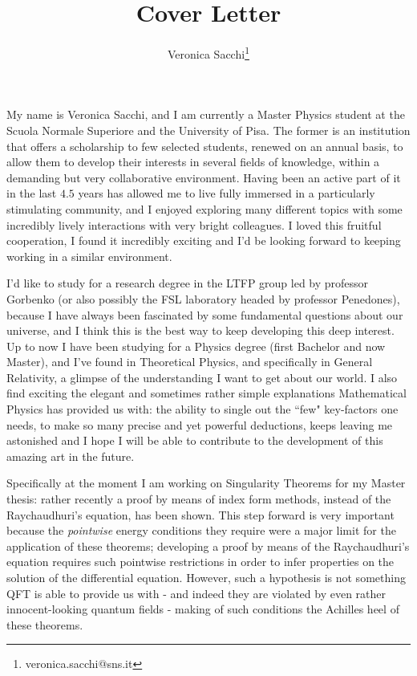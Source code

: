 \documentclass[12pt, a4paper]{article}
\title{Cover Letter}
\author{Veronica Sacchi\thanks{veronica.sacchi@sns.it}}
\begin{document}
\maketitle

My name is Veronica Sacchi, and I am currently a Master Physics student at the Scuola Normale Superiore and the University of Pisa. The former is an institution that offers a scholarship to few selected students, renewed on an annual basis, to allow them to develop their interests in several fields of knowledge, within a demanding but very collaborative environment.
Having been an active part of it in the last \(4.5\) years has allowed me to live fully immersed in a particularly stimulating community, and I enjoyed exploring many different topics with some incredibly lively interactions with very bright colleagues. I loved this fruitful cooperation, I found it incredibly exciting and I'd be looking forward to keeping working in a similar environment.

I'd like to study for a research degree in the LTFP group led by professor Gorbenko (or also possibly the FSL laboratory headed by professor Penedones), because I have always been fascinated by some fundamental questions about our universe, and I think this is the best way to keep developing this deep interest.
Up to now I have been studying for a Physics degree (first Bachelor and now Master), and I've found in Theoretical Physics, and specifically in General Relativity, a glimpse of the understanding I want to get about our world. 
I also find exciting the elegant and sometimes rather simple explanations Mathematical Physics has provided us with: the ability to single out the ``few" key-factors one needs, to make so many precise and yet powerful deductions, keeps leaving me astonished and I hope I will be able to contribute to the development of this amazing art in the future.

Specifically at the moment I am working on Singularity Theorems for my Master thesis: rather recently a proof by means of index form methods, instead of the Raychaudhuri's equation, has been shown. This step forward is very important because the \emph{pointwise} energy conditions they require were a major limit for the application of these theorems; developing a proof by means of the Raychaudhuri's equation requires such pointwise restrictions in order to infer properties on the solution of the differential equation. However, such a hypothesis is not something QFT is able to provide us with - and indeed they are violated by even rather innocent-looking quantum fields - making of such conditions the Achilles heel of these theorems.
\end{document}
